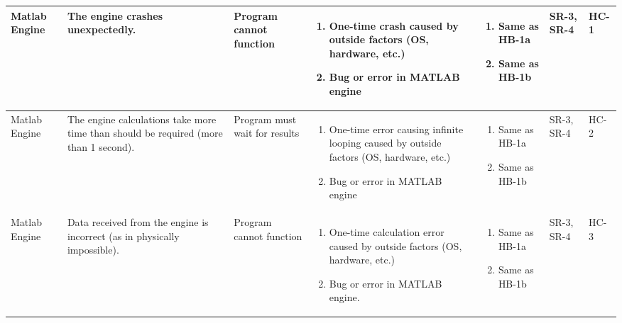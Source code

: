 \documentclass{article}
\begin{document}
\begin{landscape}
\begin{longtable}{|p{} | p{} | p{} | p{} | p{} | p{} | p{}|}
  Matlab Engine & The engine crashes unexpectedly. & Program cannot function &
  \begin{enumerate}[leftmargin=*, label={\alph*.}, itemsep=1pt, topsep=0pt, partopsep=0pt] 
    \item One-time crash caused by outside factors (OS, hardware, etc.)
    \item Bug or error in MATLAB engine   
  \end{enumerate} &
  \begin{enumerate}[leftmargin=*, label={\alph*.}, itemsep=1pt, topsep=0pt, partopsep=0pt] 
    \item Same as HB-1a
    \item Same as HB-1b 
  \end{enumerate} &
  SR-3, SR-4 & HC-1 \\

  \hline

  Matlab Engine & The engine calculations take more time than should be required (more than 1 second).
  & Program must wait for results &
  \begin{enumerate}[leftmargin=*, label={\alph*.}, itemsep=1pt, topsep=0pt, partopsep=0pt] 
    \item One-time error causing infinite looping caused by outside factors (OS, hardware, etc.)
    \item Bug or error in MATLAB engine   
  \end{enumerate} &
  \begin{enumerate}[leftmargin=*, label={\alph*.}, itemsep=1pt, topsep=0pt, partopsep=0pt] 
    \item Same as HB-1a
    \item Same as HB-1b 
  \end{enumerate} &
  SR-3, SR-4 & HC-2 \\

  \hline

  Matlab Engine & Data received from the engine is incorrect (as in physically impossible).
  & Program cannot function &
  \begin{enumerate}[leftmargin=*, label={\alph*.}, itemsep=1pt, topsep=0pt, partopsep=0pt] 
    \item One-time calculation error caused by outside factors (OS, hardware, etc.)
    \item Bug or error in MATLAB engine.  
  \end{enumerate} &
  \begin{enumerate}[leftmargin=*, label={\alph*.}, itemsep=1pt, topsep=0pt, partopsep=0pt] 
    \item Same as HB-1a
    \item Same as HB-1b 
  \end{enumerate}& 
  SR-3, SR-4 & HC-3 \\


\end{longtable}
\end{landscape}
\end{document}
